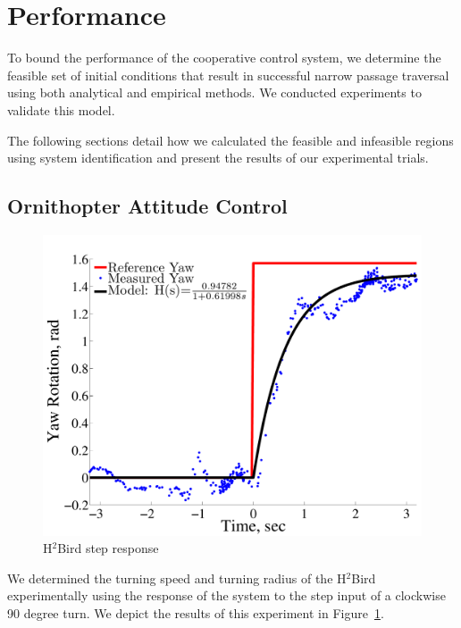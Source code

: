 \documentclass{aamas2013}
\begin{document}

\section{Performance}
To bound the performance of the cooperative control system, we determine 
the feasible set of initial conditions that result in successful narrow 
passage traversal using both analytical and empirical methods. We conducted 
experiments to validate this model.

The following sections detail how we calculated the feasible and infeasible
regions using system identification and present the results of our
experimental trials.

\subsection{Ornithopter Attitude Control}
\label{sec:flight_control}
\begin{figure}[tb]
\centering
\includegraphics[width=\linewidth]{figures/step_response_total.pdf}
\caption{H$^2$Bird step response}
\label{fig:step_response}
\end{figure}

We determined the turning speed and turning radius of the H$^2$Bird
experimentally using the response of the system to the step input of a
clockwise 90 degree turn. We depict the results of this experiment in
Figure~\ref{fig:step_response}. 
\end{document}
